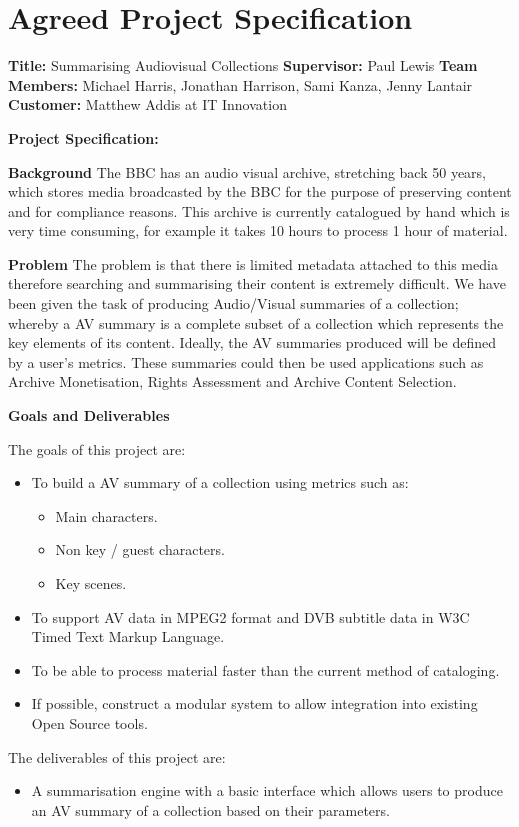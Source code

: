\section{Agreed Project Specification}
\label{sec:ProjBrief}

\textbf{Title:} Summarising Audiovisual Collections
\newline
\textbf{Supervisor:} Paul Lewis
\newline
\textbf{Team Members:} Michael Harris, Jonathan Harrison, Sami Kanza, Jenny Lantair
\newline
\textbf{Customer:} Matthew Addis at IT Innovation

\textbf{Project Specification:}

\textbf{Background}
\newline
The BBC has an audio visual archive, stretching back 50 years, which stores media broadcasted by the BBC for the purpose of preserving content and for compliance reasons. This archive is currently catalogued by hand which is very time consuming, for example it takes 10 hours to process 1 hour of material.

\textbf{Problem}
\newline
The problem is that there is limited metadata attached to this media therefore searching and summarising their content is extremely difficult. We have been given the task of producing Audio/Visual summaries of a collection; whereby a AV summary is a complete subset of a collection which represents the key elements of its content. Ideally, the AV summaries produced will be defined by a user’s metrics. These summaries could then be used applications such as Archive Monetisation, Rights Assessment and Archive Content Selection.

\textbf{Goals and Deliverables}

The goals of this project are:
\begin{itemize}
	\item{To build a AV summary of a collection using metrics such as:}
	\begin{itemize}
		\item{Main characters.}
		\item{Non key / guest characters.}
		\item{Key scenes.}
	\end{itemize}
	\item{To support AV data in MPEG2 format and DVB subtitle data in W3C Timed Text Markup Language.}
	 \item{To be able to process material faster than the current method of cataloging.}
	\item{If possible, construct a modular system to allow integration into existing Open Source tools.}
\end{itemize}
The deliverables of this project are: 
\begin{itemize}
	\item{A summarisation engine with a basic interface which allows users to produce an AV summary of a collection based on their parameters. }
\end{itemize}

